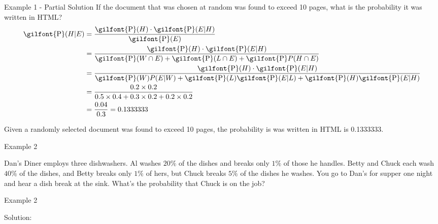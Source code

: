 \documentclass[
  ignorenonframetext,
]{beamer}
\begin{document}
\begin{frame}{Example 1 - Partial Solution}
\label{example-1---partial-solution-3}
If the document that was chosen at random was found to exceed 10 pages,
what is the probability it was written in HTML? \[
\begin{aligned}
\textrm{\gilfont{P}}\normalfont (H | E) &= \frac{\textrm{\gilfont{P}}\normalfont (H)\cdot \textrm{\gilfont{P}}\normalfont (E|H)}{\textrm{\gilfont{P}}\normalfont (E)}\\
&=\frac{\textrm{\gilfont{P}}\normalfont (H)\cdot \textrm{\gilfont{P}}\normalfont (E|H)}{\textrm{\gilfont{P}}\normalfont (W \cap E) + \textrm{\gilfont{P}}\normalfont (L\cap E) + \textrm{\gilfont{P}}\normalfont P(H \cap E)}\\
&=\frac{\textrm{\gilfont{P}}\normalfont (H)\cdot \textrm{\gilfont{P}}\normalfont (E|H)}{\textrm{\gilfont{P}}\normalfont (W)P(E|W) + \textrm{\gilfont{P}}\normalfont (L)\textrm{\gilfont{P}}\normalfont (E|L) + \textrm{\gilfont{P}}\normalfont (H)\textrm{\gilfont{P}}\normalfont (E|H)}\\
&=\frac{0.2 \times 0.2}{0.5 \times 0.4 + 0.3 \times 0.2 + 0.2 \times 0.2} \\
&=\frac{0.04}{0.3}= 0.1333333
\end{aligned}
\]

\begin{tcolorbox}
Given a randomly selected document was found to exceed 10 pages, the probability is was written in HTML is 0.1333333.
\end{tcolorbox}
\end{frame}

\begin{frame}{Example 2}
\label{example-2}
\begin{tcolorbox}
Dan's Diner employs three dishwashers. Al washes $20\%$ of the dishes and breaks only $1\%$ of those he handles. Betty and Chuck each wash $40\%$ of the dishes, and Betty breaks only $1\%$ of hers, but Chuck breaks $5\%$ of the dishes he washes. You go to Dan's for supper one night and hear a dish break at the sink. What's the probability that Chuck is on the job?


\end{tcolorbox}
\end{frame}

\begin{frame}{Example 2}
\label{example-2-1}
\begin{tcolorbox}
Solution:

\vspace{50mm}


\end{tcolorbox}
\end{frame}
\end{document}
